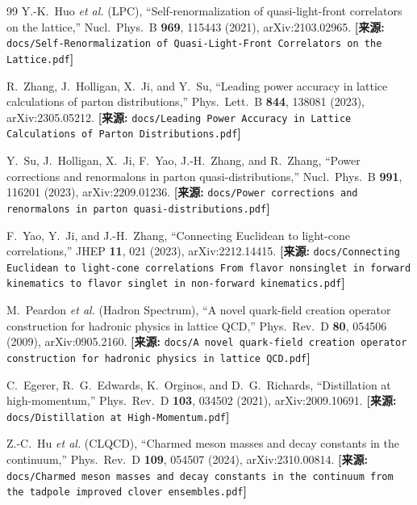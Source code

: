 \documentclass[12pt,a4paper]{ctexart}
\theoremstyle{definition}
\begin{document}
\begin{thebibliography}{99}
Y.-K.~Huo \textit{et al.} (LPC),
``Self-renormalization of quasi-light-front correlators on the lattice,''
Nucl.\ Phys.\ B \textbf{969}, 115443 (2021), arXiv:2103.02965.
\quad\textbf{[来源:} \texttt{docs/Self-Renormalization of Quasi-Light-Front Correlators on the Lattice.pdf}\textbf{]}

R.~Zhang, J.~Holligan, X.~Ji, and Y.~Su,
``Leading power accuracy in lattice calculations of parton distributions,''
Phys.\ Lett.\ B \textbf{844}, 138081 (2023), arXiv:2305.05212.
\quad\textbf{[来源:} \texttt{docs/Leading Power Accuracy in Lattice Calculations of Parton Distributions.pdf}\textbf{]}

Y.~Su, J.~Holligan, X.~Ji, F.~Yao, J.-H.~Zhang, and R.~Zhang,
``Power corrections and renormalons in parton quasi-distributions,''
Nucl.\ Phys.\ B \textbf{991}, 116201 (2023), arXiv:2209.01236.
\quad\textbf{[来源:} \texttt{docs/Power corrections and renormalons in parton quasi-distributions.pdf}\textbf{]}

F.~Yao, Y.~Ji, and J.-H.~Zhang,
``Connecting Euclidean to light-cone correlations,''
JHEP \textbf{11}, 021 (2023), arXiv:2212.14415.
\quad\textbf{[来源:} \texttt{docs/Connecting Euclidean to light-cone correlations From flavor nonsinglet in forward kinematics to flavor singlet in non-forward kinematics.pdf}\textbf{]}

M.~Peardon \textit{et al.} (Hadron Spectrum),
``A novel quark-field creation operator construction for hadronic physics in lattice QCD,''
Phys.\ Rev.\ D \textbf{80}, 054506 (2009), arXiv:0905.2160.
\quad\textbf{[来源:} \texttt{docs/A novel quark-field creation operator construction for hadronic physics in lattice QCD.pdf}\textbf{]}

C.~Egerer, R.~G.~Edwards, K.~Orginos, and D.~G.~Richards,
``Distillation at high-momentum,''
Phys.\ Rev.\ D \textbf{103}, 034502 (2021), arXiv:2009.10691.
\quad\textbf{[来源:} \texttt{docs/Distillation at High-Momentum.pdf}\textbf{]}

Z.-C.~Hu \textit{et al.} (CLQCD),
``Charmed meson masses and decay constants in the continuum,''
Phys.\ Rev.\ D \textbf{109}, 054507 (2024), arXiv:2310.00814.
\quad\textbf{[来源:} \texttt{docs/Charmed meson masses and decay constants in the continuum from the tadpole improved clover ensembles.pdf}\textbf{]}


\end{thebibliography}
\end{document}
